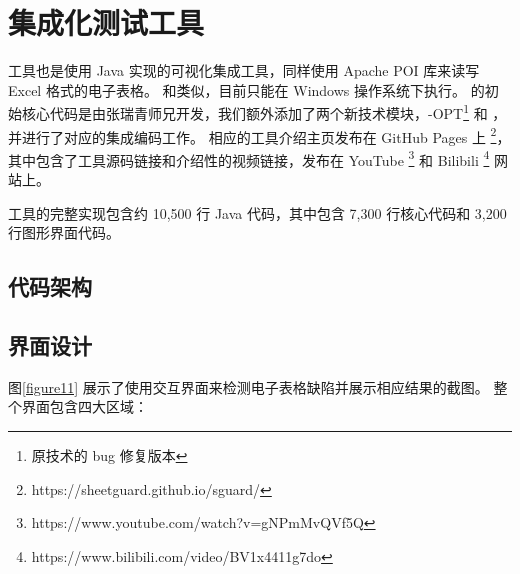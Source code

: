 \section{集成化测试工具 \sg }
\sg 工具也是使用 Java 实现的可视化集成工具，同样使用 Apache POI 库来读写 Excel 格式的电子表格。
和\wa 类似，目前只能在 Windows 操作系统下执行。
\sg 的初始核心代码是由张瑞青师兄开发，我们额外添加了两个新技术模块，\cu-OPT\footnote{原\cu 技术的 bug 修复版本} 和 \wa ，并进行了对应的集成编码工作。
相应的工具介绍主页发布在 GitHub Pages 上 \footnote{https://sheetguard.github.io/sguard/}，其中包含了工具源码链接和介绍性的视频链接，发布在 YouTube \footnote{https://www.youtube.com/watch?v=gNPmMvQVf5Q} 和 Bilibili \footnote{https://www.bilibili.com/video/BV1x4411g7do} 网站上。

\sg 工具的完整实现包含约 10,500 行 Java 代码，其中包含 7,300 行核心代码和 3,200 行图形界面代码。

\subsection{代码架构}


\subsection{界面设计}

% 



% 
图\ref{figure11} 展示了\sg 使用交互界面来检测电子表格缺陷并展示相应结果的截图。
整个界面包含四大区域：

